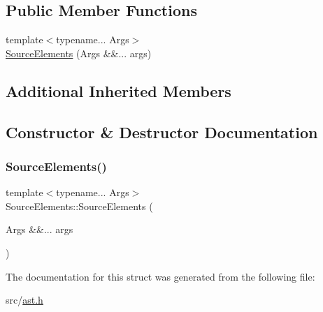 \subsection*{Public Member Functions}
\begin{DoxyCompactItemize}
\item 
{\footnotesize template$<$typename... Args$>$ }\\\hyperlink{struct_source_elements_a1f7065c95d241407e691f198c8dd9b19}{Source\+Elements} (Args \&\&... args)
\end{DoxyCompactItemize}
\subsection*{Additional Inherited Members}


\subsection{Constructor \& Destructor Documentation}
\mbox{\label{struct_source_elements_a1f7065c95d241407e691f198c8dd9b19}} 
\subsubsection{\texorpdfstring{Source\+Elements()}{SourceElements()}}
{\footnotesize\ttfamily template$<$typename... Args$>$ \\
Source\+Elements\+::\+Source\+Elements (\begin{DoxyParamCaption}\item[{Args \&\&...}]{args }\end{DoxyParamCaption})\hspace{0.3cm}{\ttfamily [inline]}}



The documentation for this struct was generated from the following file\+:\begin{DoxyCompactItemize}
\item 
src/\hyperlink{ast_8h}{ast.\+h}\end{DoxyCompactItemize}
